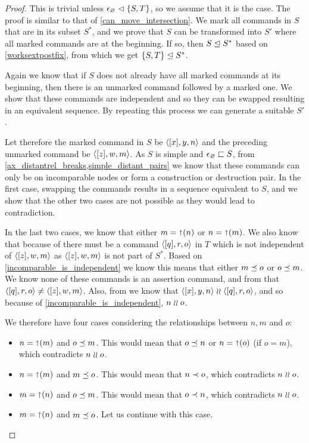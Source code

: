 \begin{proof}
This is trivial unless ${\epsilon_\varnothing}\vartriangleleft{\{{S,T}\}}$, so we assume that it is the case.
The proof is similar to that of \cref{can_move_intersection}.
We mark all commands in $S$ that are in its subset $S^*$, and
we prove that $S$ can be transformed into $S'$
where all marked commands are at the beginning.
If so, then 
${S}\trianglelefteq{S^*}$ based on \cref{worksextpostfix},
from which we get ${\{{S,T}\}}\trianglelefteq{S^*}$.

Again we know that if $S$ does not already have all marked commands at its beginning,
then there is an unmarked command followed by a marked one.
We show that these commands are independent and so they can be swapped
resulting in an equivalent sequence.
By repeating this process we can generate a suitable $S'$.

Let therefore the marked command in $S$ be $\langle{[x],y,n}\rangle$
and the preceding unmarked command be $\langle{[z],w,m}\rangle$.
As $S$ is simple and $\epsilon_\varnothing\sqsubset{S}$, from 
\cref{ax_distantrel_breaks,simple_distant_pairs}
we know that these commands can only be on incomparable nodes or form a construction or destruction pair.
In the first case, swapping the commands results in a sequence equivalent to $S$,
and we show that the other two cases are not possible as they would lead to contradiction.

In the last two cases, we know that either $m=\mathord{\shortuparrow}(n)$ or $n=\mathord{\shortuparrow}(m)$.
We also know that because of {\condApr} there must be 
a command $\langle{[q],r,o}\rangle$ in $T$ which is not independent of $\langle{[z],w,m}\rangle$
as $\langle{[z],w,m}\rangle$ is not part of $S^*$.
Based on \cref{incomparable_is_independent} we know this means that
either $m\preceq o$ or $o\preceq m$.
We know none of these commands is an assertion command, and 
from {\condDisj} that $\langle{[q],r,o}\rangle\neq\langle{[z],w,m}\rangle$.
Also, from {\condApr} we know that $\langle{[x],y,n}\rangle\mathrel{\wr\wr} \langle{[q],r,o}\rangle$,
and so because of \cref{incomparable_is_independent},
$n\mathrel{\wr\wr} o$.

We therefore have four cases considering the relationships between $n,m$ and $o$:
\begin{itemize}
\item $n=\mathord{\shortuparrow}(m)$ and $o\preceq m$.
   This would mean that $o\preceq n$ or $n=\mathord{\shortuparrow}(o)$ (if $o=m$), which contradicts $n\mathrel{\wr\wr} o$.
\item $n=\mathord{\shortuparrow}(m)$ and $m\preceq o$.
   This would mean that $n\prec o$, which contradicts $n\mathrel{\wr\wr} o$.
\item $m=\mathord{\shortuparrow}(n)$ and $o\preceq m$.
   This would mean that $o\prec n$, which contradicts $n\mathrel{\wr\wr} o$.
\item $m=\mathord{\shortuparrow}(n)$ and $m\preceq o$.
   Let us continue with this case.
\end{itemize}


\end{proof}
